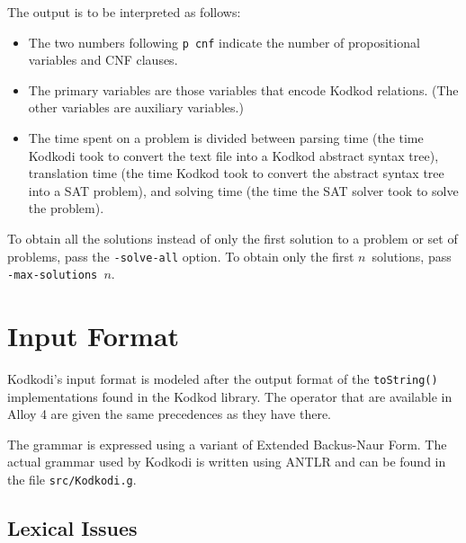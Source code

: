 \documentclass[a4paper,12pt]{article}
\begin{document}
The output is to be interpreted as follows:
%
\begin{itemize}
\item The two numbers following \texttt{p~cnf} indicate the number of
propositional variables and CNF clauses.
\item The primary variables are those variables that encode Kodkod relations.
(The other variables are auxiliary variables.)
\item The time spent on a problem is divided between parsing time (the time
Kodkodi took to convert the text file into a Kodkod abstract syntax tree),
translation time (the time Kodkod took to convert the abstract syntax tree into
a SAT problem), and solving time (the time the SAT solver took to solve the
problem).
\end{itemize}
%
To obtain all the solutions instead of only the first solution to a problem or
set of problems, pass the \texttt{-solve-all} option. To obtain only the first
$n$~solutions, pass \texttt{-max-solutions~$n$}.

\section{Input Format}
\label{input-format}

Kodkodi's input format is modeled after the output format of the
\texttt{toString()} implementations found in the Kodkod library. The operator
that are available in Alloy 4 are given the same precedences as they have there.

The grammar is expressed using a variant of Extended Backus-Naur Form. The
actual grammar used by Kodkodi is written using ANTLR and can be found in the
file \texttt{src/Kodkodi.g}.

\subsection{Lexical Issues}
\label{lexical-issues}
\end{document}
